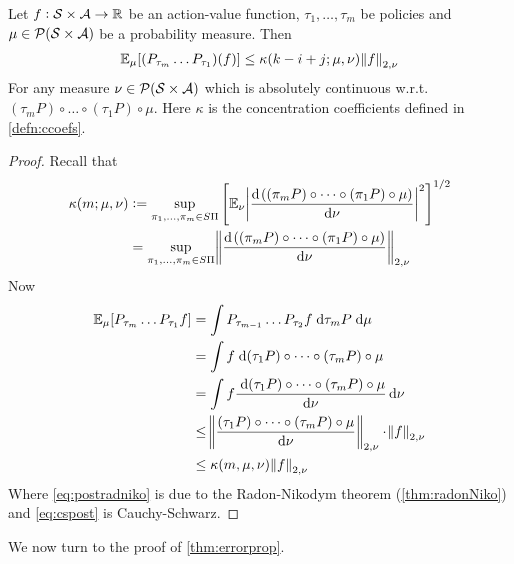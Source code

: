 \begin{lem}\label{lem:MRN}
  Let $f:\mathcal{S}\times\mathcal{A} \to \mathbb{R}$ be an action-value function,
  $\tau_1, \dots, \tau_m$ be policies
  and $\mu \in \mathcal{P}(\mathcal{S}\times\mathcal{A})$ be a probability measure.
  Then
  \begin{align*}
    \mathbb{E}_\mu [(P_{\tau_m} \dots P_{\tau_1})(f)]
    \leq \kappa(k - i + j; \mu, \nu) \norm{f}_{2,\nu}
  \end{align*}
  For any measure $\nu \in \mathcal{P}(\mathcal{S}\times\mathcal{A})$ which is
  absolutely continuous w.r.t.
  $(\tau_m P) \circ \dots \circ (\tau_1 P) \circ \mu$.
  Here $\kappa$ is the concentration coefficients defined in \cref{defn:ccoefs}.
\end{lem}
\begin{proof} \label{proof:C1}
  Recall that
  \begin{align*}
    \kappa(m; \mu, \nu) &\defeq \sup_{\pi_1, \dots, \pi_m \in S\Pi} \left[
      \E_{\nu} \abs{\frac{\dif\; ((\pi_m P) \circ \dots \circ (\pi_1 P) \circ \mu)}
  {\dif \nu}}^2 \right]^{1/2}
    \\ &= \sup_{\pi_1, \dots, \pi_m \in S\Pi}
    \norm{\frac{\dif\; ((\pi_m P) \circ \dots \circ (\pi_1 P) \circ \mu)}
    {\dif \nu}}_{2, \nu}
  \end{align*}
  Now
  \begin{align}
    \E_\mu [ P_{\tau_m} \dots P_{\tau_1} f]
    &= \int P_{\tau_{m-1}} \dots P_{\tau_2} f \difd \tau_m P \difd \mu
    \\ &= \int f \difd (\tau_1 P) \circ \dots \circ (\tau_m P) \circ \mu
    \label{eq:preradniko}
    \\ &= \int f \frac{\difd (\tau_1 P) \circ \dots \circ (\tau_m P) \circ \mu}
    {\dif \nu} \dif \nu
    \label{eq:postradniko}
    \\ &\leq \norm{\frac{(\tau_1 P) \circ \dots \circ (\tau_m P) \circ \mu}
    {\dif \nu}}_{2,\nu}
    \cdot \norm{f}_{2, \nu} \label{eq:cspost}
    \\ &\leq \kappa(m, \mu, \nu) \norm{f}_{2,\nu}
  \end{align}
  Where \cref{eq:postradniko} is due to the Radon-Nikodym theorem
  (\cref{thm:radonNiko})
  and \cref{eq:cspost} is Cauchy-Schwarz.
\end{proof}

We now turn to the proof of \cref{thm:errorprop}.

